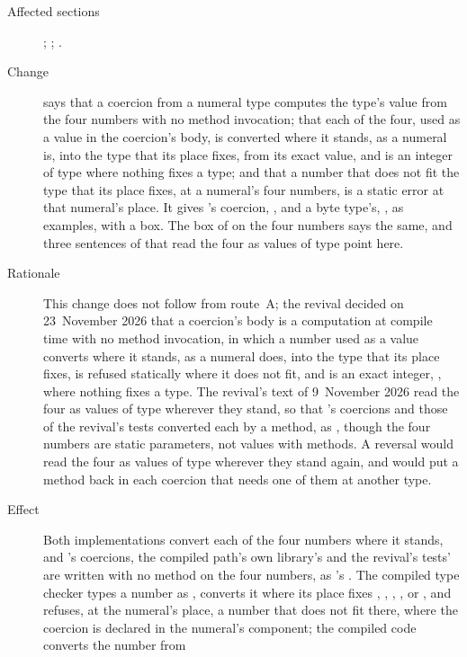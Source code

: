 \begin{description}
\item[Affected sections] ; ;
.
\item[Change]  says that a coercion from a numeral type
computes the type's value from the four numbers with no method invocation; that
each of the four, used as a value in the coercion's body, is converted where it
stands, as a numeral is, into the type that its place fixes, from its exact
value, and is an integer of type  where nothing fixes a type;
and that a number that does not fit the type that its place fixes, at a
numeral's four numbers, is a static error at that numeral's place.
It gives 's coercion, , and a byte type's,
, as examples, with a box.
The box of  on the four numbers says the same, and three
sentences of  that read the four as values of type
 point here.
\item[Rationale] This change does not follow from route~A; the revival decided
on 23~November 2026 that a coercion's body is a computation at compile time with
no method invocation, in which a number used as a value converts where it
stands, as a numeral does, into the type that its place fixes, is refused
statically where it does not fit, and is an exact integer, ,
where nothing fixes a type.
The revival's text of 9~November 2026 read the four as values of type
 wherever they stand, so that \library's coercions and those of
the revival's tests converted each by a method, as , though
the four numbers are static parameters, not values with methods.
A reversal would read the four as values of type  wherever they
stand again, and would put a method back in each coercion that needs one of
them at another type.
\item[Effect] Both implementations convert each of the four numbers where it
stands, and \library's coercions, the compiled path's own library's and the
revival's tests' are written with no method on the four numbers, as
's .
The compiled type checker types a number as , converts it where
its place fixes , , ,
,  or , and refuses, at the
numeral's place, a number that does not fit there, where the coercion is
declared in the numeral's component; the compiled code converts the number from

\end{description}
